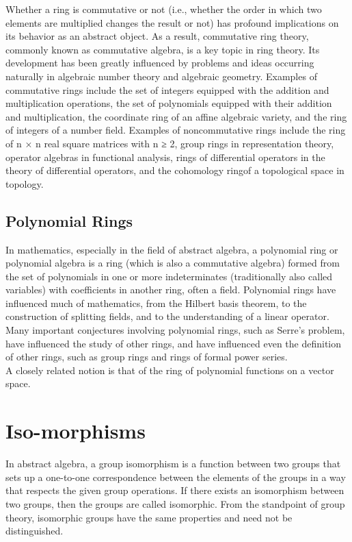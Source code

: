 Whether a ring is commutative or not (i.e., whether the order in which two elements are multiplied changes the result or not) has profound implications on its behavior as an abstract object. As a result, commutative ring theory, commonly known as commutative algebra, is a key topic in ring theory. Its development has been greatly influenced by problems and ideas occurring naturally in algebraic number theory and algebraic geometry. Examples of commutative rings include the set of integers equipped with the addition and multiplication operations, the set of polynomials equipped with their addition and multiplication, the coordinate ring of an affine algebraic variety, and the ring of integers of a number field. Examples of noncommutative rings include the ring of n × n real square matrices with n ≥ 2, group rings in representation theory, operator algebras in functional analysis, rings of differential operators in the theory of differential operators, and the cohomology ringof a topological space in topology.\\

\subsection{Polynomial Rings}

In mathematics, especially in the field of abstract algebra, a polynomial ring or polynomial algebra is a ring (which is also a commutative algebra) formed from the set of polynomials in one or more indeterminates (traditionally also called variables) with coefficients in another ring, often a field. Polynomial rings have influenced much of mathematics, from the Hilbert basis theorem, to the construction of splitting fields, and to the understanding of a linear operator. Many important conjectures involving polynomial rings, such as Serre's problem, have influenced the study of other rings, and have influenced even the definition of other rings, such as group rings and rings of formal power series.\\

A closely related notion is that of the ring of polynomial functions on a vector space. \\

\section{Iso-morphisms}

In abstract algebra, a group isomorphism is a function between two groups that sets up a one-to-one correspondence between the elements of the groups in a way that respects the given group operations. If there exists an isomorphism between two groups, then the groups are called isomorphic. From the standpoint of group theory, isomorphic groups have the same properties and need not be distinguished.


